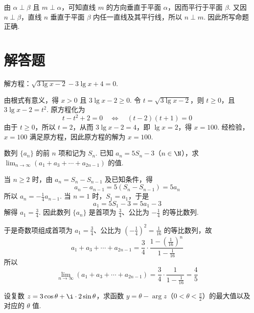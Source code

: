 \begin{solution}
由 \(\alpha\perp\beta\) 且 \(m\perp\alpha\)，可知直线 \(m\) 的方向垂直于平面 \(\alpha\)，因而平行于平面 \(\beta\). 又因 \(n\perp\beta\)，直线 \(n\) 垂直于平面 \(\beta\) 内任一直线及其平行线，所以 \(n\perp m\). 因此所写命题正确.
\end{solution}

\section{解答题}

\begin{problem}
解方程：\(\sqrt{3\lg x-2}-3\lg x+4=0\).
\end{problem}

\begin{solution}
由根式有意义，得 \(x>0\) 且 \(3\lg x-2\geqslant0\). 令 \(t=\sqrt{3\lg x-2}\)，则 \(t\geqslant0\)，且 \(3\lg x-2=t^2\). 原方程化为
\[
t-t^2+2=0\quad\Longleftrightarrow\quad (t-2)(t+1)=0
\]
由于 \(t\geqslant0\)，所以 \(t=2\)，从而 \(3\lg x-2=4\)，即 \(\lg x=2\)，得 \(x=100\). 经检验，\(x=100\) 满足原方程，因此原方程的解为 \(x=100\).
\end{solution}

\begin{problem}
数列 \(\{a_{n}\}\) 的前 \(n\) 项和记为 \(S_{n}\). 已知 \(a_{n} = 5S_{n} - 3\)（\(n \in \N\)），求 \(\displaystyle\lim_{n \to \infty}(a_{1} + a_{3} + \cdots + a_{2n-1})\) 的值.
\end{problem}

\begin{solution}
当 \(n\geqslant2\) 时，由 \(a_n=S_n-S_{n-1}\) 及已知条件，得
\[
a_n-a_{n-1}=5(S_n-S_{n-1})=5a_n
\]
所以 \(a_n=-\frac14a_{n-1}\). 当 \(n=1\) 时，\(S_1=a_1\)，于是
\[
a_1=5S_1-3=5a_1-3
\]
解得 \(a_1=\frac34\). 因此数列 \(\{a_n\}\) 是首项为 \(\frac34\)、公比为 \(-\frac14\) 的等比数列.

于是奇数项组成首项为 \(a_1=\frac34\)、公比为 \(\left(-\frac14\right)^2=\frac1{16}\) 的等比数列，故
\[
a_1+a_3+\cdots+a_{2n-1}=\frac34\cdot\frac{1-\left(\frac1{16}\right)^n}{1-\frac1{16}}
\]
所以
\[
\lim_{n\to\infty}(a_1+a_3+\cdots+a_{2n-1})
=\frac34\cdot\frac1{1-\frac1{16}}=\frac45
\]
\end{solution}

\begin{problem}
设复数 \(z=3\cos\theta+\i\cdot 2\sin\theta\)，求函数 \(y=\theta-\arg z\)（\(0<\theta<\frac{\pi}{2}\)）的最大值以及对应的 \(\theta\) 值.
\end{problem}

